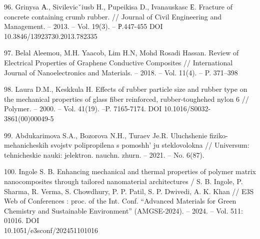 \begin{references}
96. Grinysa А., Sivilevicˇiusb H., Pupeikisa D., Ivanauskasc Е. Fracture
of concrete containing crumb rubber. // Journal of Civil Engineering and
Management. -- 2013. -- Vol. 19(3). -- Р.447-455 DOI\\
10.3846/13923730.2013.782335

97. Belal Aleemou, M.H. Yaacob, Lim H.N, Mohd Rosadi Hassan. Review of
Electrical Properties of Graphene Conductive Composites // International
Journal of Nanoelectronics and Materials. -- 2018. -- Vol. 11(4). -- P.
371--398

98. Laura D.M., Keskkula H. Effects of rubber particle size and rubber
type on the mechanical properties of glass fiber reinforced,
rubber-toughehed nylon 6 // Polymer. -- 2000. -- Vol. 41(19). --P.
7165-7174. DOI 10.1016/S0032-3861(00)00049-5

99. Abdukarimova S.A., Bozorova N.H., Turaev Je.R. Uluchshenie
fiziko-mehanicheskih svojstv poliprop\-ilena s pomoshh' ju
steklovolokna // Universum: tehnicheskie nauki: jelektron. nauchn.
zhurn. -- 2021. -- No. 6(87).

100. Ingole S. B. Enhancing mechanical and thermal properties of polymer
matrix nanocomposites through tailored nanomaterial architectures / S.
B. Ingole, P. Sharma, R. Verma, S. Chowdhury, P. P. Patil, S. P.
Dwivedi, A. K. Khan // E3S Web of Conferences : proc. of the Int. Conf.
``Advanced Materials for Green Chemistry and Sustainable Environment''
(AMGSE-2024). -- 2024. -- Vol. 511: 01016. DOI\\
10.1051/e3sconf/202451101016
\end{references}

